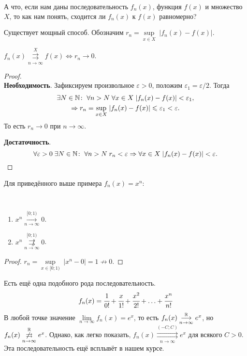 	А что, если нам даны последовательность $f_n(x)$, функция $f(x)$ и множество $X$, то как нам понять, сходится ли $f_n(x)$ к $f(x)$ равномерно?
	
	Существует мощный способ. Обозначим $r_n =\underset{x \in X}{\sup}\;|f_n(x) - f(x)|$.
	\begin{Statement}
		$f_n(x)\overset{X}{\underset{n\to\infty}{\rightrightarrows}} f(x) \Leftrightarrow r_n\to 0$.
	\end{Statement}
	\begin{proof}\ \\
		\textbf{Необходимость}. Зафиксируем произвольное $\varepsilon > 0$, положим $\varepsilon_1 = \varepsilon/2$. Тогда
		\begin{gather*}
			\exists N\in \mathbb{N} \colon\; \forall n>N\; \forall x \in X\; |f_n(x) - f(x)| < \varepsilon_1,\\
			\Rightarrow r_n =  \underset{x \in X}{\sup}\; |f_n(x) - f(x)| \leqslant \varepsilon_1 < \varepsilon.
		\end{gather*}
		То есть $r_n \to 0$ при $n\to \infty$.
		\par \textbf{Достаточность}.
		$$
		\forall \varepsilon > 0\; \exists N \in \mathbb{N}\colon \; \forall n>N\; r_n < \varepsilon \Rightarrow \forall x \in X\; |f_n(x) - f(x)| < \varepsilon.
		$$
	\end{proof}
	Для приведённого выше примера $f_n(x) = x^n$:
	\begin{Statement}\ \\		
		\begin{enumerate}
			\item $x^n \overset{[0;1)}{\underset{n\to\infty}{\longrightarrow}} 0$.
			\item $x^n \overset{[0;1)}{\underset{n\to\infty}{\not\rightrightarrows}} 0$.
		\end{enumerate}
	\end{Statement}
	\begin{proof}
		$r_n = \underset{x\in[0;1)}{\sup}\;|x^n - 0| = 1 \not\to 0$.
	\end{proof}
	Есть ещё одна подобного рода последовательность.
	$$
		f_n(x) = \cfrac{1}{0!} + \cfrac{x}{1!} + \cfrac{x^2}{2!} + \ldots + \cfrac{x^n}{n!}
	$$
	В любой точке значение $\lim\limits_{n \to \infty} f_n(x) = e^x$, то есть 	$f_n(x) \overset{\mathbb{R}}{\underset{n\to\infty}{\longrightarrow}} e^x$, но $f_n(x) \overset{\mathbb{R}}{\underset{n\to\infty}{\not\rightrightarrows}} e^x$. Однако, как легко показать, $f_n(x) \overset{(-C;C)}{\underset{n\to\infty}{\rightrightarrows}} e^x$ для всякого $C>0$. Эта последовательность ещё всплывёт в нашем курсе.
